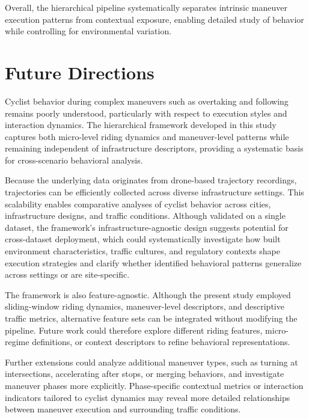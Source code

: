 Overall, the hierarchical pipeline systematically separates intrinsic maneuver execution patterns from contextual exposure, enabling detailed study of behavior while controlling for environmental variation.

\section{Future Directions}
Cyclist behavior during complex maneuvers such as overtaking and following remains poorly understood, particularly with respect to execution styles and interaction dynamics. The hierarchical framework developed in this study captures both micro-level riding dynamics and maneuver-level patterns while remaining independent of infrastructure descriptors, providing a systematic basis for cross-scenario behavioral analysis.

Because the underlying data originates from drone-based trajectory recordings, trajectories can be efficiently collected across diverse infrastructure settings. This scalability enables comparative analyses of cyclist behavior across cities, infrastructure designs, and traffic conditions. Although validated on a single dataset, the framework's infrastructure-agnostic design suggests potential for cross-dataset deployment, which could systematically investigate how built environment characteristics, traffic cultures, and regulatory contexts shape execution strategies and clarify whether identified behavioral patterns generalize across settings or are site-specific.

The framework is also feature-agnostic. Although the present study employed sliding-window riding dynamics, maneuver-level descriptors, and descriptive traffic metrics, alternative feature sets can be integrated without modifying the pipeline. Future work could therefore explore different riding features, micro-regime definitions, or context descriptors to refine behavioral representations.

Further extensions could analyze additional maneuver types, such as turning at intersections, accelerating after stops, or merging behaviors, and investigate maneuver phases more explicitly. Phase-specific contextual metrics or interaction indicators tailored to cyclist dynamics may reveal more detailed relationships between maneuver execution and surrounding traffic conditions.


